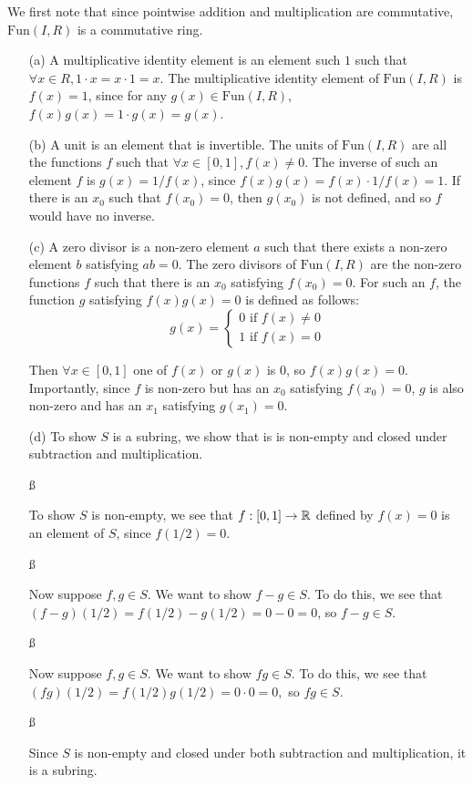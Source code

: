 \documentclass{hmwk}
\begin{document}
\begin{solution}
We first note that since pointwise addition and multiplication are commutative, $\mathrm{Fun}(I, R)$ is a commutative ring.

\begin{itemize}
    \item[(a)] A multiplicative identity element is an element such $1$ such that $\forall x \in R, 1 \cdot x = x \cdot 1 = x$. The multiplicative identity element of $\mathrm{Fun}(I, R)$ is $f(x) = 1$, since for any $g(x) \in \mathrm{Fun}(I, R)$, $f(x)g(x) = 1\cdot g(x) = g(x)$.

    \item[(b)] A unit is an element that is invertible. The units of $\mathrm{Fun}(I, R)$ are all the functions $f$ such that $\forall x \in [0, 1], f(x) \neq 0$. The inverse of such an element $f$ is $g(x) = 1/f(x)$, since $f(x)g(x) = f(x) \cdot 1/f(x) = 1$. If there is an $x_0$ such that $f(x_0) = 0$, then $g(x_0)$ is not defined, and so $f$ would have no inverse. 

    \item[(c)] A zero divisor is a non-zero element $a$ such that there exists a non-zero element $b$ satisfying $ab = 0$. The zero divisors of $\mathrm{Fun}(I, R)$ are the non-zero functions $f$ such that there is an $x_0$ satisfying $f(x_0) = 0$. For such an $f$, the function $g$ satisfying $f(x)g(x) = 0$ is defined as follows: 
    $$g(x) = \begin{cases}
        0 \text{ if } f(x) \neq 0 \\
        1 \text{ if } f(x) = 0
    \end{cases}$$

    Then $\forall x \in [0, 1]$ one of $f(x)$ or $g(x)$ is 0, so $f(x)g(x) = 0$. Importantly, since $f$ is non-zero but has an $x_0$ satisfying $f(x_0) = 0$, $g$ is also non-zero and has an $x_1$ satisfying $g(x_1) = 0$. 

    \item[(d)] To show $S$ is a subring, we show that is is non-empty and closed under subtraction and multiplication. 

    \ss 

    To show $S$ is non-empty, we see that $f: [0, 1] \rightarrow \mathbb{R}$ defined by $f(x) = 0$ is an element of $S$, since $f(1/2) = 0$.

    \ss 

    Now suppose $f, g \in S$. We want to show $f - g \in S$. To do this, we see that $(f - g)(1/2) = f(1/2) - g(1/2) = 0 - 0 = 0$, so $f - g \in S$.

    \ss 

    Now suppose $f, g \in S$. We want to show $fg \in S$. To do this, we see that $(fg)(1/2) = f(1/2)g(1/2) = 0 \cdot 0 = 0,$ so $fg \in S$.

    \ss 

    Since $S$ is non-empty and closed under both subtraction and multiplication, it is a subring.
\end{itemize}
\end{solution}
\end{document}
